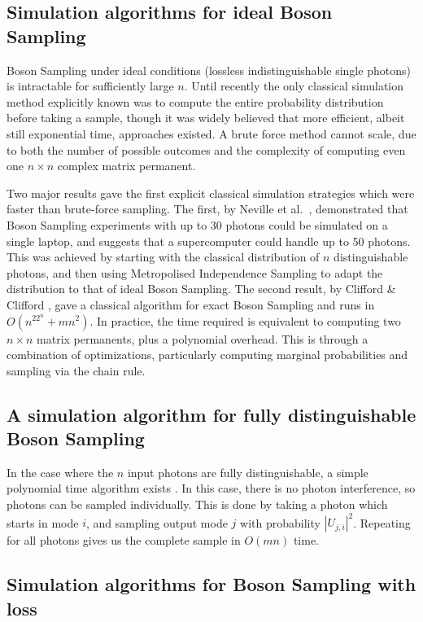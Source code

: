 \subsection{Simulation algorithms for ideal Boson Sampling}

Boson Sampling under ideal conditions (lossless indistinguishable single photons) is intractable for sufficiently large $n$. 
Until recently the only classical simulation method explicitly known was to compute the entire probability distribution before taking a sample, though it was widely believed that more efficient, albeit still exponential time, approaches existed. 
A brute force method cannot scale, due to both the number of possible outcomes and the complexity of computing even one $n\times n$ complex matrix permanent.

Two major results gave the first explicit classical simulation strategies which were faster than brute-force sampling. 
The first, by Neville et al.~\cite{neville2017}, demonstrated that Boson Sampling experiments with up to 30 photons could be simulated on a single laptop, and suggests that a supercomputer could handle up to 50 photons. 
This was achieved by starting with the classical distribution of $n$ distinguishable photons, and then using Metropolised Independence Sampling to adapt the distribution to that of ideal Boson Sampling.
The second result, by Clifford \& Clifford \cite{clifford2017}, gave a classical algorithm for exact Boson Sampling and runs in $O(n^22^n + mn^2)$. In practice, the time required is equivalent to computing two $n \times n$ matrix permanents, plus a polynomial overhead.
This is through a combination of optimizations, particularly computing marginal probabilities and sampling via the chain rule.

\subsection{A simulation algorithm for fully distinguishable Boson Sampling}
\label{ssec:fully-dist-sim}

In the case where the $n$ input photons are fully distinguishable, a simple polynomial time algorithm exists \cite{aaronson2014}. In this case, there is no photon interference, so photons can be sampled individually. This is done by taking a photon which starts in mode $i$, and sampling output mode $j$ with probability $|U_{j,i}|^2$. Repeating for all photons gives us the complete sample in $O(mn)$ time.

\subsection{Simulation algorithms for Boson Sampling with loss}
\label{ssec:simulating-lossy-bs}

